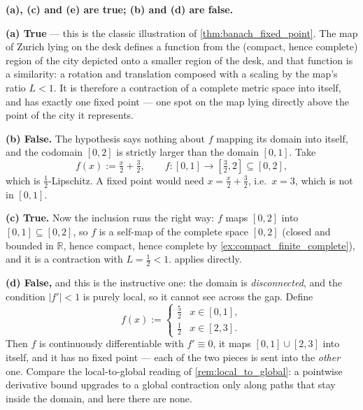 \begin{exercisesolution}
\textbf{(a), (c) and (e) are true; (b) and (d) are false.}

\textbf{(a) True} --- this is the classic illustration of \cref{thm:banach_fixed_point}. The map
of Zurich lying on the desk defines a function from the (compact, hence complete) region of the
city depicted onto a smaller region of the desk, and that function is a similarity: a rotation
and translation composed with a scaling by the map's ratio $L < 1$. It is therefore a contraction
of a complete metric space into itself, and has exactly one fixed point --- one spot on the map
lying directly above the point of the city it represents.

\textbf{(b) False.} The hypothesis says nothing about $f$ mapping its domain into itself, and the
codomain $[0,2]$ is strictly larger than the domain $[0,1]$. Take
\[f(x) := \tfrac{x}{2} + \tfrac32, \qquad f : [0,1] \to [\tfrac32,2] \subseteq [0,2],\]
which is $\tfrac12$-Lipschitz. A fixed point would need $x = \tfrac x2 + \tfrac32$, i.e.\ $x=3$,
which is not in $[0,1]$.

\textbf{(c) True.} Now the inclusion runs the right way: $f$ maps $[0,2]$ into
$[0,1] \subseteq [0,2]$, so $f$ is a self-map of the complete space $[0,2]$
(closed and bounded in $\mathbb{R}$, hence compact, hence complete by
\cref{ex:compact_finite_complete}), and it is a contraction with $L = \tfrac12 < 1$.
 applies directly.

\textbf{(d) False,} and this is the instructive one: the domain is \emph{disconnected}, and the
condition $|f'| < 1$ is purely local, so it cannot see across the gap. Define
\[f(x) := \begin{cases} \tfrac52 & x \in [0,1], \\ \tfrac12 & x \in [2,3].\end{cases}\]
Then $f$ is continuously differentiable with $f' \equiv 0$, it maps
$[0,1]\cup[2,3]$ into itself, and it has no fixed point --- each of the two pieces is sent into
the \emph{other} one. Compare the local-to-global reading of
\cref{rem:local_to_global}: a pointwise derivative bound upgrades to a global contraction only
along paths that stay inside the domain, and here there are none.


\end{exercisesolution}
